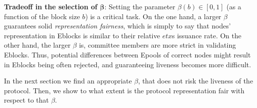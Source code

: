 

\textbf{Tradeoff in the selection of $\pmb{\beta}$}: Setting the parameter $\beta (b) \in [0,1]$ (as a function of the block size $b$) is a critical task. On the one hand, a larger $\beta$ guarantees solid \emph{representation fairness}, which is simply to say that nodes' representation in Eblocks is similar to their relative $etx$s issuance rate. On the other hand, the larger $\beta$ is, committee members are more strict in validating Eblocks. Thus, potential differences between Epools of correct nodes might result in Eblocks being often rejected, and guaranteeing liveness becomes more difficult. %

In the next section we find an appropriate $\beta$, that does not risk the liveness of the protocol. Then, we show to what extent is the protocol representation fair with respect to that $\beta$.










